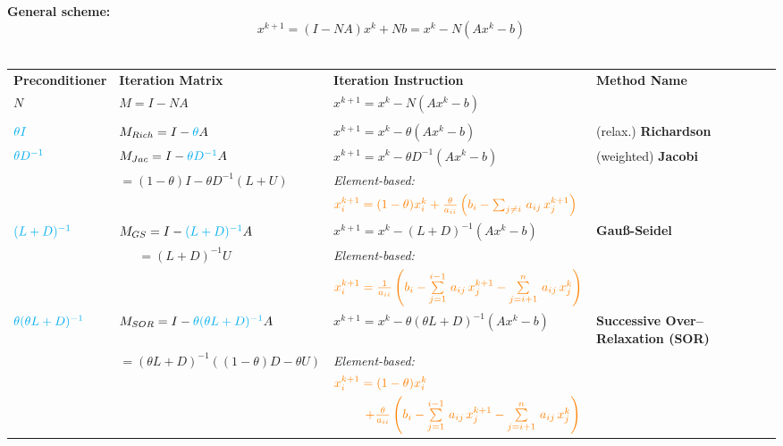 \begin{frame}
\textbf{\color{header}General scheme:}
\footnotesize
$$x^{k+1} = (I-NA)x^k + Nb = x^k - N(Ax^k-b)$$
~\\
\hspace*{-0.2cm}\begin{tabular}{l|l|l|l} 
\textbf{Preconditioner} 			& \textbf{Iteration Matrix} & \textbf{Iteration Instruction} & \textbf{Method Name}\\[0.25cm]
$N$ &$M=I - NA$& $x^{k+1} = x^k -N(Ax^k - b)$&\\[0.25cm]
\hline\\
${\color{cyan}\theta I}$ 	   		&$M_{Rich} =I-{\color{cyan}\theta} A$ 		&$x^{k+1}=x^k-\theta(Ax^k-b)$				& (relax.)\textbf{ Richardson}  \\[0.99cm]
${\color{cyan}\theta D^{-1}}$		&$M_{Jac} =  I-{\color{cyan}\theta D^{-1}}A$ 		&$x^{k+1}=x^k-\theta D^{-1}(Ax^k-b)$ 		&(weighted)\textbf{ Jacobi}\\[0.2cm]
&$=(1-\theta)I-\theta D^{-1}(L+U)$&\textit{\footnotesize Element-based:}&\\
&& ${\color{orange}x^{k+1}_i = (1-\theta)x_i^k +  \frac{\theta}{a_{ii}}\left( b_i - \sum_{j\neq i} \,a_{ij} \, x_j^{k+1}\right)  }$ &\\[0.99cm]
${\color{cyan}( L+D )^{-1}}$&$M_{GS} =I-{\color{cyan}( L+D )^{-1}}A$ 	&$x^{k+1}=x^k-( L+D )^{-1}(Ax^k-b)$  	&\textbf{Gauß-Seidel}\\[0.2cm]
&~~~$=(L+D)^{-1}U$&\textit{\footnotesize Element-based:}&\\
&& ${\color{orange}x^{k+1}_i =   \frac{1}{a_{ii}}\left( b_i - \sum\limits^{i-1}_{j=1} \,a_{ij} \, x_j^{k+1} -  \sum\limits^n_{j = i+1} \, a_{ij} \, x^k_j  \right) }$ &\\[0.99cm]
${\color{cyan}\theta( \theta L+D )^{-1}}$&$M_{SOR} =I-{\color{cyan}\theta( \theta L+D )^{-1}}A$ 	&$x^{k+1}=x^k-\theta( \theta L+D )^{-1}(Ax^k-b)$  	&\textbf{Successive Over--Relaxation (SOR)}\\[0.2cm]
&{\scriptsize $=(\theta L +D)^{-1} ((1-\theta)D-\theta U)$}&\textit{\footnotesize Element-based:}&\\
&& ${\color{orange}x^{k+1}_i = (1-\theta)x_i^k}$\\
&&~~~~~$ {\color{orange}+   \frac{\theta}{a_{ii}}\left( b_i - \sum\limits^{i-1}_{j=1} \,a_{ij} \, x_j^{k+1} -  \sum\limits^n_{j = i+1} \, a_{ij} \, x^k_j  \right) }$ &
\end{tabular}
\end{frame}






